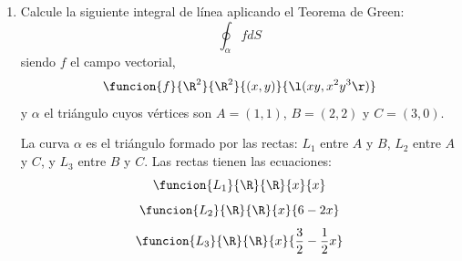 \documentclass[a4,11pt]{aleph-examen}
\begin{document}
\begin{preguntas}
\begin{respuesta}
\begin{respuesta}
\begin{respuesta}
\begin{enumerate}
\begin{respuesta}
		Como $C$ es una curva cerrada; sea $D$ la región límitada por $C$. Primero debemos parametrizar la curva $C$ en sentido antihorario, para ello utilizamos dos funciones
		\[
		\funcion{\alpha_1}{\lcl-1,1\rcl}{\R^2}{t}{(t,1)}
		\yds
		\funcion{\alpha_2}{\lcl-1,1\rcl}{\R^2}{t}{(-t,2-t^2).}
		\]
		Como la curva $C$ es cerrada, tenemos que
			\begin{align*}
				\int_C f \cdot \ ds
				&=\int_{\alpha_1} f \cdot \ ds+
				\int_{\alpha_2} f \cdot \ ds\\
				&=\int_{-1}^1 f(\alpha_1(t)) \cdot \alpha_1'(t) dt+
				\int_{-1}^1 f(\alpha_2(t)) \cdot \alpha_2'(t) dt\\
				&=\int_{-1}^1 f(t,1) \cdot (1,0) dt+
				\int_{-1}^1 f(-t,2-t^2) \cdot (-1,-2t) dt\\
				&=\int_{-1}^1 e^t dt+
				\int_{-1}^1 -(2-t^2)^2e^{-t}-2t^3e^{2-t^2} dt\\
				&=48e^{-1}-8e\approx -4.1.
			\end{align*}
		Por otro lado, tenemos que 
		\[
		\iint_D\rot(f)\ dA
		=\int_{-1}^1\int_1^{2-x^2}2xe^y-2ye^x\ dydx=48e^{-1}-8e\approx -4.1.
		\]
		Como se puede observar ambas integrales coinciden; es decir, 
		\[
		\int_{\partial D} f \cdot \ ds
		=\iint_D\rot(f)\ dA.\qedhere
		\]
\end{respuesta}

\item Calcule la siguiente integral de línea aplicando el Teorema de Green:
	\[
     \oint_\alpha f dS
    \]
siendo $f$ el campo vectorial,
		\[
        	\funcion{f}{\R^2}{\R^2}{(x,y)}{\l(xy,x^2y^3\r)} 
        \]
y $\alpha$ el triángulo cuyos vértices son $A=(1,1)$, $B=(2,2)$ y $C=(3,0)$. 

\begin{respuesta}
La curva $\alpha$ es el triángulo formado por las rectas: $L_1$ entre $A$ y $B$, $L_2$ entre $A$ y $C$, y $L_3$ entre $B$ y $C$. Las rectas tienen las ecuaciones:
		\[
        	\funcion{L_1}{\R}{\R}{x}{x} 
        \]
        \[
        	\funcion{L_2}{\R}{\R}{x}{6-2x} 
        \]
        \[
        	\funcion{L_3}{\R}{\R}{x}{\frac{3}{2}-\frac{1}{2}x} 
        \]
\begin{center}
\end{center}


\end{respuesta}
\end{enumerate}
\end{respuesta}
\end{respuesta}
\end{respuesta}
\end{preguntas}
\end{document}
